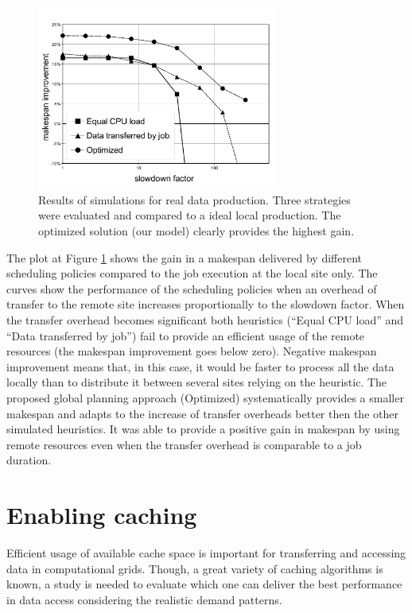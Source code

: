 \documentclass[english]{ddny}
\begin{document}
\begin{figure}[h]
    \centering
    \includegraphics[trim =5mm 5mm 5mm 10mm ,clip,width=0.7\textwidth]{pic/makespan_vs_slowdown4.pdf}
    \caption{Results of simulations for real data production. Three strategies were evaluated and compared to a ideal local production. The
   optimized solution (our model) clearly provides the highest gain.}
    \label{fig:makespan_vs_slowdown}
\end{figure}

The plot at Figure \ref{fig:makespan_vs_slowdown} shows the gain in a makespan delivered by different scheduling policies compared to the job execution at the local site only. The curves show the performance of the scheduling policies when an overhead of transfer to the remote site increases proportionally to the slowdown factor. When the transfer overhead becomes significant both heuristics (``Equal CPU load'' and ``Data transferred by job'') fail to provide an efficient usage of the remote resources (the makespan improvement goes below zero). Negative makespan improvement means that, in this case, it would be faster to process all the data locally than to distribute it between several sites relying on the heuristic. The proposed global planning approach (Optimized) systematically provides a smaller makespan and adapts to the increase of transfer overheads better then the other simulated  heuristics. It was able to provide a positive gain in makespan by using remote resources even when the transfer overhead is comparable to a job duration.  

\section{Enabling caching}
\label{Cache}
Efficient usage of available cache space is important for transferring and accessing data in computational grids. Though, a great variety of caching algorithms is known, a study is needed to evaluate which one can deliver the best performance in data access considering the realistic demand patterns.
 
\end{document}
